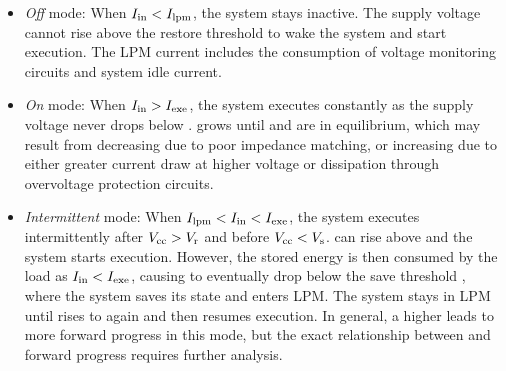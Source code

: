 \begin{itemize}
	\item \textit{Off} mode: When $I_{\text{in}} < I_{\text{lpm}}$, the system stays inactive. The supply voltage  cannot rise above the restore threshold  to wake the system and start execution. The LPM current  includes the consumption of voltage monitoring circuits and system idle current.

    \item \textit{On} mode: When $I_{\text{in}} > I_{\text{exe}}$, the system executes constantly as the supply voltage  never drops below .  grows until  and  are in equilibrium, which may result from  decreasing due to poor impedance matching, or  increasing due to either greater current draw at higher voltage or dissipation through overvoltage protection circuits. 

	\item \textit{Intermittent} mode: When $I_{\text{lpm}} < I_{\text{in}} < I_{\text{exe}}$, the system executes intermittently after $V_{\text{cc}} > V_{\text{r}}$ and before $V_{\text{cc}} < V_{\text{s}}$.  can rise above  and the system starts execution. However, the stored energy is then consumed by the load as $I_{\text{in}} < I_{\text{exe}}$, causing  to eventually drop below the save threshold , where the system saves its state and enters LPM. The system stays in LPM until  rises to  again and then resumes execution. 
    In general, a higher  leads to more forward progress in this mode, but the exact relationship between  and forward progress requires further analysis.
    
\end{itemize}

